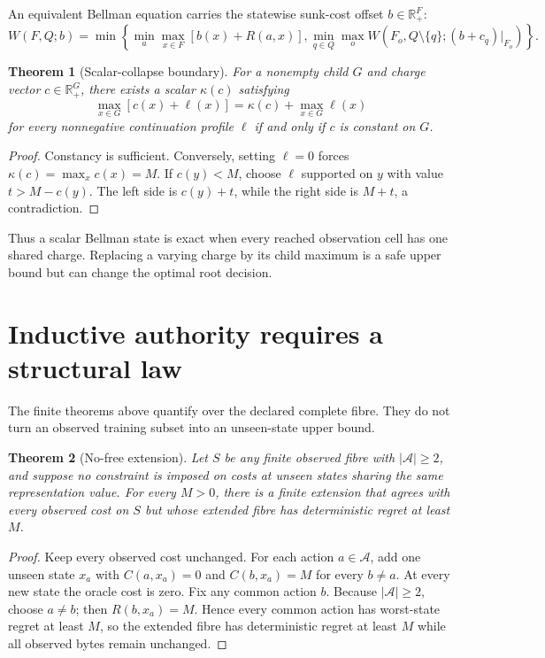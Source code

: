 \documentclass[11pt]{article}
\newtheorem{theorem}{Theorem}
\theoremstyle{definition}
\theoremstyle{remark}
\newcommand{\A}{\mathcal A}
\newcommand{\Rplus}{\mathbb R_{+}}
\begin{document}
An equivalent Bellman equation carries the statewise sunk-cost offset $b\in\Rplus^F$:
\[
 W(F,Q;b)=\min\left\{
   \min_a\max_{x\in F}[b(x)+R(a,x)],
   \min_{q\in Q}\max_o W(F_o,Q\setminus\{q\};(b+c_q)|_{F_o})
 \right\}.
\]

\begin{theorem}[Scalar-collapse boundary]\label{thm:scalar}
For a nonempty child $G$ and charge vector $c\in\Rplus^G$, there exists a scalar $\kappa(c)$ satisfying
\[
 \max_{x\in G}[c(x)+\ell(x)]
 =\kappa(c)+\max_{x\in G}\ell(x)
\]
for every nonnegative continuation profile $\ell$ if and only if $c$ is constant on $G$.
\end{theorem}
\begin{proof}
Constancy is sufficient.  Conversely, setting $\ell=0$ forces $\kappa(c)=\max_xc(x)=M$.  If $c(y)<M$, choose $\ell$ supported on $y$ with value $t>M-c(y)$.  The left side is $c(y)+t$, while the right side is $M+t$, a contradiction.
\end{proof}

Thus a scalar Bellman state is exact when every reached observation cell has one shared charge.  Replacing a varying charge by its child maximum is a safe upper bound but can change the optimal root decision.

\section{Inductive authority requires a structural law}

The finite theorems above quantify over the declared complete fibre.  They do not turn an observed training subset into an unseen-state upper bound.

\begin{theorem}[No-free extension]\label{thm:nofree}
Let $S$ be any finite observed fibre with $|\A|\ge2$, and suppose no constraint is imposed on costs at unseen states sharing the same representation value.  For every $M>0$, there is a finite extension that agrees with every observed cost on $S$ but whose extended fibre has deterministic regret at least $M$.
\end{theorem}
\begin{proof}
Keep every observed cost unchanged.  For each action $a\in\A$, add one unseen state $x_a$ with $C(a,x_a)=0$ and $C(b,x_a)=M$ for every $b\ne a$.  At every new state the oracle cost is zero.  Fix any common action $b$.  Because $|\A|\ge2$, choose $a\ne b$; then $R(b,x_a)=M$.  Hence every common action has worst-state regret at least $M$, so the extended fibre has deterministic regret at least $M$ while all observed bytes remain unchanged.
\end{proof}
\end{document}
